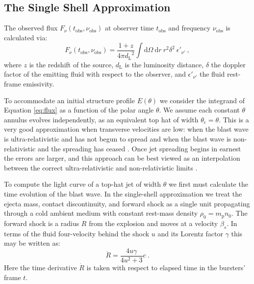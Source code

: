 \documentclass[twocolumn]{aastex62}
\newcommand{\dd}{\ensuremath{\mathrm{d}}}
\newcommand{\tobs}{\ensuremath{t_{\mathrm{obs}}}}
\newcommand{\nuobs}{\ensuremath{\nu_{\mathrm{obs}}}}
\newcommand{\thC}{\ensuremath{\theta_{\mathrm{c}}}}
\newcommand{\dL}{\ensuremath{d_{\mathrm{L}}}}
\newcommand{\Mp}{\ensuremath{m_{\mathrm{p}}}}
\begin{document}
\subsection{The Single Shell Approximation}\label{subsec:algo}

The observed flux $F_\nu(\tobs, \nuobs)$ at observer time $\tobs$ and frequency $\nuobs$ is calculated via:
\begin{equation}
	F_\nu(\tobs, \nuobs) = \frac{1+z}{4\pi \dL^2} \int \! \dd \Omega\  \dd r\ r^2 \delta^2\ \epsilon'_{\nu'} \ , \label{eq:flux}
\end{equation}
where $z$ is the redshift of the source, $\dL$ is the luminosity distance, $\delta$ the doppler factor of the emitting fluid with respect to the observer, and $\epsilon'_{\nu'}$ the fluid rest-frame emissivity.

To accommodate an initial structure profile $E(\theta)$ we consider the integrand of Equation \eqref{eq:flux} as a function of the polar angle $\theta$.  We assume each constant $\theta$ annulus evolves independently, as an equivalent top hat of width $\thC = \theta$.  This is a very good approximation when transverse velocities are low: when the blast wave is ultra-relativistic and has not begun to spread and when the blast wave is non-relativistic and the spreading has ceased \citep{van-Eerten:2010aa}.  Once jet spreading begins in earnest the errors are larger, and this approach can be best viewed as an interpolation between the correct ultra-relativistic and non-relativistic limits \citep{van-Eerten:2010aa}.
 
To compute the light curve of a top-hat jet of width $\theta$ we first must calculate the time evolution of the blast wave. In the single-shell approximation we treat the ejecta mass, contact discontinuity, and forward shock as a single unit propagating through a cold ambient medium with constant rest-mass density $\rho_0 = \Mp n_0$.  The forward shock is a radius $R$ from the explosion and moves at a velocity $\beta_s$.  In terms of the fluid four-velocity behind the shock $u$ and its Lorentz factor $\gamma$ this may be written as:
\begin{equation}
	\dot{R} = \frac{4 u \gamma}{4 u^2 +3}c\ . \label{eq:Rdot}
\end{equation}
Here the time derivative $\dot{R}$ is taken with respect to elapsed time in the bursters' frame $t$.  
\end{document}
